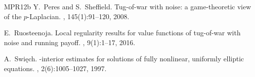 \documentclass[english]{amsart}
\theoremstyle{plain}
\theoremstyle{definition}
\theoremstyle{remark}
\numberwithin{equation}{section}
\begin{document}
\begin{thebibliography}{MPR12b}
Y.~Peres and S.~Sheffield.
\newblock Tug-of-war with noise: a game-theoretic view of the
  {$p$}-{L}aplacian.
, 145(1):91--120, 2008.

E.~Ruosteenoja.
\newblock Local regularity results for value functions of tug-of-war with noise
  and running payoff.
, 9(1):1--17, 2016.

A.~Swi\k{e}ch.
-interior estimates for solutions of fully nonlinear,
  uniformly elliptic equations.
, 2(6):1005--1027, 1997.

\end{thebibliography}
\end{document}

